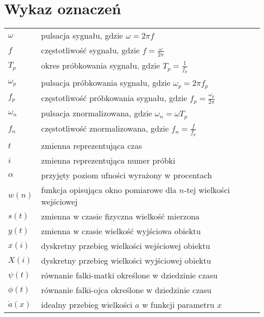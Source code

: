 \chapter*{Wykaz oznaczeń}

\begin{longtable}[l]{ l @{~~--~~} p{376pt} }
$\omega$                        & pulsacja sygnału, gdzie $\omega = 2\pi f$ \\
$f$                             & częstotliwość sygnału, gdzie $f = \frac{\omega}{2\pi}$ \\
$T_{p}$                         & okres próbkowania sygnału, gdzie $T_{p} = \frac{1}{f_{p}}$ \\
$\omega_{p}$                    & pulsacja próbkowania sygnału, gdzie $\omega_{p} = 2\pi f_{p}$ \\
$f_{p}$                         & częstotliwość próbkowania sygnału, gdzie $f_{p} = \frac{\omega_{p}}{2\pi}$ \\
$\omega_{n}$                    & pulsacja znormalizowana, gdzie $\omega_{n} = \omega T_{p}$ \\
$f_{n}$                         & częstotliwość znormalizowana, gdzie $f_{n} = \frac{f}{f_{p}}$ \\
$t$                             & zmienna reprezentująca czas \\
$i$                             & zmienna reprezentująca numer próbki \\
$\alpha$                        & przyjęty poziom ufności wyrażony w procentach \\
$w(n)$                          & funkcja opisująca okno pomiarowe dla $n$-tej wielkości wejściowej \\
$s(t)$                          & zmienna w czasie fizyczna wielkość mierzona \\
$y(t)$                          & zmienna w czasie wielkość wyjściowa obiektu \\
$x(i)$                          & dyskretny przebieg wielkości wejściowej obiektu \\
$X(i)$                          & dyskretny przebieg wielkości wyjściowej obiektu \\
$\psi(t)$                       & równanie falki-matki określone w dziedzinie czasu \\
$\phi(t)$                       & równanie falki-ojca określone w dziedzinie czasu \\
$\dot{a}(x)$                    & idealny przebieg wielkości $a$ w funkcji parametru $x$ \\

\end{longtable}
